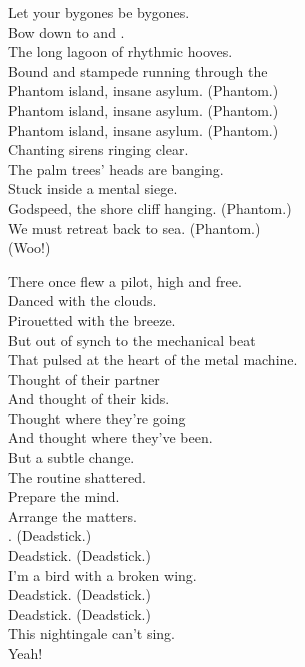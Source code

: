 Let your bygones be bygones. \\
Bow down to  and . \\
The long lagoon of rhythmic hooves. \\
Bound and stampede running through the \\

Phantom island, insane asylum. (Phantom.) \\
Phantom island, insane asylum. (Phantom.) \\
Phantom island, insane asylum. (Phantom.) \\
Chanting sirens ringing clear. \\

The palm trees' heads are banging. \\
Stuck inside a mental siege. \\
Godspeed, the shore cliff hanging. (Phantom.) \\
We must retreat back to sea. (Phantom.) \\
(Woo!) \\





There once flew a pilot, high and free. \\
Danced with the clouds. \\
Pirouetted with the breeze. \\
But out of synch to the mechanical beat \\
That pulsed at the heart of the metal machine. \\

Thought of their partner \\
And thought of their kids. \\
Thought where they're going \\
And thought where they've been. \\
But a subtle change. \\
The routine shattered. \\
Prepare the mind. \\
Arrange the matters. \\

. (Deadstick.) \\
Deadstick. (Deadstick.) \\
I'm a bird with a broken wing. \\
Deadstick. (Deadstick.) \\
Deadstick. (Deadstick.) \\
This nightingale can't sing. \\
Yeah! \\


